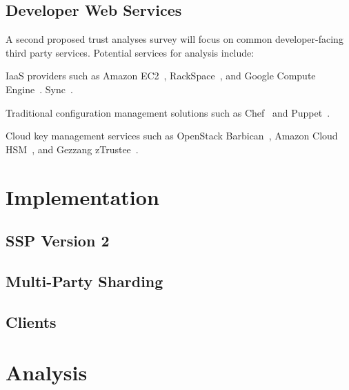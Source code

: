 \subsection{Developer Web Services}

A second proposed trust analyses survey will focus on common
developer-facing third party services. Potential services for analysis
include:

\begin{packed_item}
\item IaaS providers such as Amazon EC2~\cite{amazon-ec2},
  RackSpace~\cite{rackspace-compute}, and Google Compute
  Engine~\cite{google-compute}.  Sync~\cite{bittorrent-sync}.
\item Traditional configuration management solutions such as
  Chef~\cite{chef} and Puppet~\cite{puppet}.
\item Cloud key management services such as OpenStack
  Barbican~\cite{openstack-barbican}, Amazon Cloud
  HSM~\cite{amazon-hsm}, and Gezzang zTrustee~\cite{gazzang}.
\end{packed_item}

\section{Implementation}

\subsection{SSP Version 2}

\subsection{Multi-Party Sharding}

\subsection{Clients}

\section{Analysis}

